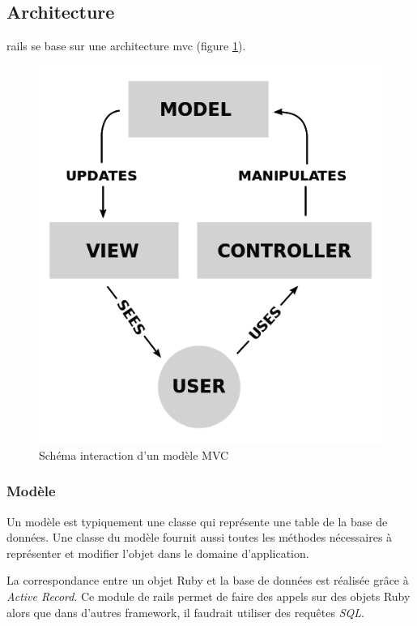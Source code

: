 \subsection{Architecture}
\gls{rails} se base sur une architecture \gls{mvc} \cite{wiki-mvc} (figure \ref{fig:mvc}).
\begin{figure}[ht]
  \begin{center}
    \includegraphics[scale=0.3]{content/4-prerequis/images/mvc}
    \caption{Schéma interaction d'un modèle MVC}
    \label{fig:mvc}
  \end{center}
\end{figure}
\subsubsection{Modèle}
Un modèle est typiquement une classe qui représente une table de la base de données. Une classe du modèle fournit aussi toutes les méthodes nécessaires à représenter et modifier l'objet dans le domaine d'application.

La correspondance entre un objet Ruby et la base de données est réalisée grâce à \textit{Active Record}. Ce module de \gls{rails} permet de faire des appels sur des objets Ruby alors que dans d'autres framework, il faudrait utiliser des requêtes \textit{SQL}. \label{active-record}

